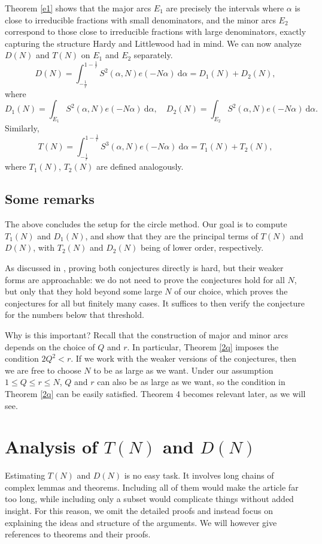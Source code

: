 \documentclass{article}
\begin{document}
Theorem \ref{e1} shows that the major arcs $E_1$ are precisely the intervals where $\alpha$ is close to irreducible fractions with small denominators, and the minor arcs $E_2$ correspond to those close to irreducible fractions with large denominators, exactly capturing the structure Hardy and Littlewood had in mind. We can now analyze $D(N)$ and $T(N)$ on $E_1$ and $E_2$ separately.
\begin{equation*}
    D(N) = \int_{-\frac{1}{r}}^{1 - \frac{1}{r}}S^2(\alpha, N)e(-N\alpha) \ \mathrm{d}\alpha = D_1(N) +D_2(N),
\end{equation*}
where
\begin{equation*}
    D_1(N) = \int_{E_1}S^2(\alpha, N)e(-N\alpha) \ \mathrm{d}\alpha, \quad D_2(N) = \int_{E_2}S^2(\alpha, N)e(-N\alpha) \ \mathrm{d}\alpha.
\end{equation*}
Similarly,
\begin{equation*}
    T(N) = \int_{-\frac{1}{r}}^{1 - \frac{1}{r}}S^3(\alpha, N)e(-N\alpha) \ \mathrm{d}\alpha = T_1(N) +T_2(N),
\end{equation*}
where $T_1(N)$, $T_2(N)$ are defined analogously.
\subsection{Some remarks}
The above concludes the setup for the circle method. Our goal is to compute $T_1(N)$ and $D_1(N)$, and show that they are the principal terms of $T(N)$ and $D(N)$, with $T_2(N)$ and $D_2(N)$ being of lower order, respectively. 

As discussed in \cite{gold}, proving both conjectures directly is hard, but their weaker forms are approachable: we do not need to prove the conjectures hold for all $N$, but only that they hold beyond some large $N$ of our choice, which proves the conjectures for all but finitely many cases. It suffices to then verify the conjecture for the numbers below that threshold. 

Why is this important? Recall that the construction of major and minor arcs depends on the choice of $Q$ and $r$. In particular, Theorem \ref{2q} imposes the condition $2Q^2 < r$. If we work with the weaker versions of the conjectures, then we are free to choose $N$ to be as large as we want. Under our assumption $1 \leq Q\leq r \leq N$, $Q$ and $r$ can also be as large as we want, so the condition in Theorem \ref{2q} can be easily satisfied. Theorem 4 becomes relevant later, as we will see.

\section{Analysis of $T(N)$ and $D(N)$}
Estimating $T(N)$ and $D(N)$ is no easy task. It involves long chains of complex lemmas and theorems. Including all of them would make the article far too long, while including only a subset would complicate things without added insight. For this reason, we omit the detailed proofs and instead focus on explaining the ideas and structure of the arguments. We will however give references to theorems and their proofs.
\end{document}
